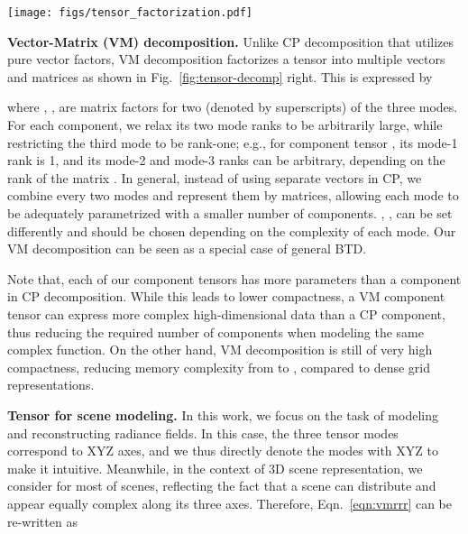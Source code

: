 \documentclass[runningheads]{llncs}
\newcommand{\boldstartspace}[1]{\vspace{0.1in}\noindent\textbf{#1}}
\begin{document}
\begin{figure*}[t]
    \texttt{[image: figs/tensor\_factorization.pdf]}
\caption{Tensor factorization. Left: CP decomposition (Eqn.~\ref{eqn:cpvector}), which factorizes a tensor as a sum of vector outer products.  Right: our vector-matrix decomposition (Eqn.~\ref{eqn:vmrrr}), which factorizes a tensor as a sum of vector-matrix outer products.}
    \label{fig:tensor-decomp}\vspace{-5mm}
\end{figure*}


\boldstartspace{Vector-Matrix (VM) decomposition.} Unlike CP decomposition that utilizes pure vector factors, VM decomposition factorizes a tensor into multiple vectors and matrices as shown in Fig.~\ref{fig:tensor-decomp} right. This is expressed by

where , ,  are matrix factors for two (denoted by superscripts) of the three modes.
For each component, we relax its two mode ranks to be arbitrarily large, while restricting the third mode to be rank-one; e.g., for component tensor , its mode-1 rank is 1, and its mode-2 and mode-3 ranks can be arbitrary, depending on the rank of the matrix .
In general, instead of using separate vectors in CP, we combine every two modes and represent them by matrices, allowing each mode to be adequately parametrized with a smaller number of components. , ,  can be set differently and should be chosen depending on the complexity of each mode.
Our VM decomposition can be seen as a special case of general BTD. 

Note that, each of our component tensors has more parameters than a component in CP decomposition. 
While this leads to lower compactness, a VM component tensor can express more complex high-dimensional data than a CP component, thus reducing the required number of components when modeling the same complex function. 
On the other hand, VM decomposition is still of very high compactness, reducing memory complexity from  to , compared to dense grid representations.


\boldstartspace{Tensor for scene modeling.} 
In this work, we focus on the task of modeling and reconstructing radiance fields.
In this case, the three tensor modes correspond to XYZ axes, and we thus directly denote the modes with XYZ to make it intuitive.
Meanwhile, in the context of 3D scene representation, we consider  for most of scenes, reflecting the fact that a scene can distribute and appear equally complex along its three axes.
Therefore, Eqn.~\ref{eqn:vmrrr} can be re-written as
\end{document}
